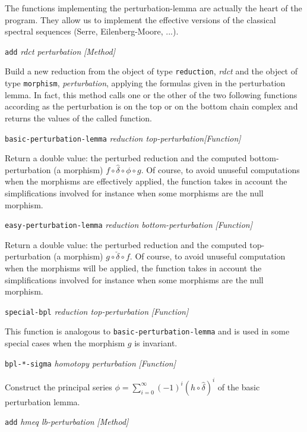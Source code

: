 The functions implementing the perturbation-lemma are
actually the heart of the program. They allow us
to implement the effective versions of the classical spectral sequences
(Serre, Eilenberg-Moore, ...).
\vskip 0.35cm
{\parindent=0mm
{\leftskip=5mm
{\tt add} {\em rdct perturbation} \hfill {\em [Method]} \par}
{\leftskip=15mm
Build a new reduction from the  object of type {\tt reduction}, {\em rdct} and
the  object of type {\tt morphism},  {\em perturbation},
applying the formulas given in the perturbation lemma. In fact, this
method calls  one or the other of the two following functions according as the perturbation is on the top
or on the bottom chain complex and returns the values of the called function. \par}
{\leftskip=5mm
{\tt basic-perturbation-lemma} {\em reduction top-perturbation}\hfill {\em [Function]} \par}
{\leftskip=15mm
Return a double value: the perturbed reduction and the computed bottom-perturbation (a morphism)
$f \circ {\hat \delta}\circ  \phi \circ g$. Of course, to avoid unuseful computations when the morphisms
are effectively applied, the function takes in account the simplifications involved for instance when
some morphisms are the null morphism. \par}
{\leftskip=5mm
{\tt easy-perturbation-lemma} {\em reduction bottom-perturbation} \hfill {\em [Function]} \par}
{\leftskip=15mm
Return a double value: the perturbed reduction and the computed top-perturbation (a morphism)
$g \circ {\check \delta} \circ f$. Of course, to avoid unuseful computation when the morphisms
will be applied, the function takes in account the simplifications involved for instance when
some morphisms are the null morphism. \par}
{\leftskip=5mm
{\tt special-bpl} {\em reduction top-perturbation} \hfill {\em [Function]} \par}
{\leftskip=15mm
This function is analogous to {\tt basic-perturbation-lemma} and is used in some special cases
when the morphism $g$ is invariant. \par}
{\leftskip=5mm
{\tt bpl-*-sigma} {\em  homotopy perturbation} \hfill {\em [Function]} \par}
{\leftskip=15mm
Construct the principal series
$\phi=\sum_{i=0}^{\infty}{(-1)^i(h \circ  \hat{\delta})^i}$ of the basic
perturbation lemma. \par}
{\leftskip=5mm
{\tt add} {\em  hmeq lb-perturbation} \hfill {\em [Method]} \par}
}
